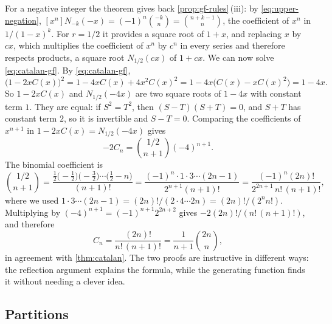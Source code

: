 For a negative integer the theorem gives back \cref{prop:gf-rules}\,(iii): by \eqref{eq:upper-negation}, $[x^n]N_{-k}(-x)=(-1)^n\binom{-k}{n}=\binom{n+k-1}{n}$, the coefficient of $x^n$ in $1/(1-x)^k$. For $r=1/2$ it provides a square root of $1+x$, and replacing $x$ by $cx$, which multiplies the coefficient of $x^n$ by $c^n$ in every series and therefore respects products, a square root $N_{1/2}(cx)$ of $1+cx$. We can now solve \eqref{eq:catalan-gf}. By \eqref{eq:catalan-gf},
\[
\bigl(1-2xC(x)\bigr)^2=1-4xC(x)+4x^2C(x)^2=1-4x\bigl(C(x)-xC(x)^2\bigr)=1-4x .
\]
So $1-2xC(x)$ and $N_{1/2}(-4x)$ are two square roots of $1-4x$ with constant term $1$. They are equal: if $S^2=T^2$, then $(S-T)(S+T)=0$, and $S+T$ has constant term $2$, so it is invertible and $S-T=0$. Comparing the coefficients of $x^{n+1}$ in $1-2xC(x)=N_{1/2}(-4x)$ gives
\[
-2C_n=\binom{1/2}{n+1}(-4)^{n+1}.
\]
The binomial coefficient is
\[
\binom{1/2}{n+1}=\frac{\frac12\bigl(-\frac12\bigr)\bigl(-\frac32\bigr)\cdots\bigl(\frac12-n\bigr)}{(n+1)!}=\frac{(-1)^n\cdot1\cdot3\cdots(2n-1)}{2^{n+1}(n+1)!}=\frac{(-1)^n(2n)!}{2^{2n+1}\,n!\,(n+1)!},
\]
where we used $1\cdot3\cdots(2n-1)=(2n)!/(2\cdot4\cdots2n)=(2n)!/(2^nn!)$. Multiplying by $(-4)^{n+1}=(-1)^{n+1}2^{2n+2}$ gives $-2(2n)!/(n!\,(n+1)!)$, and therefore
\[
C_n=\frac{(2n)!}{n!\,(n+1)!}=\frac1{n+1}\binom{2n}{n},
\]
in agreement with \cref{thm:catalan}. The two proofs are instructive in different ways: the reflection argument explains the formula, while the generating function finds it without needing a clever idea.

\subsection{Partitions}


